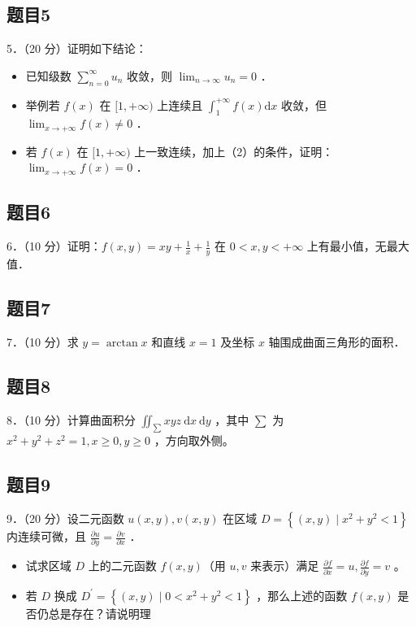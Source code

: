 \documentclass{article}
\begin{document}
\subsection{题目5}
5．（20 分）证明如下结论：

\begin{itemize}
  \item[（1）] 已知级数 \(\sum_{n=0}^{\infty} u_{n}\) 收敛，则 \(\lim _{n \rightarrow \infty} u_{n}=0\) ．
  \item[（2）] 举例若 \(f(x)\) 在 \([1,+\infty)\) 上连续且 \(\int_{1}^{+\infty} f(x) \mathrm{d} x\) 收敛，但 \(\lim _{x \rightarrow+\infty} f(x) \neq 0\) ．
  \item[（3）] 若 \(f(x)\) 在 \([1,+\infty)\) 上一致连续，加上（2）的条件，证明： \(\lim _{x \rightarrow+\infty} f(x)=0\) ．
\end{itemize}

\subsection{题目6}
6．（10 分）证明：\(f(x, y)=x y+\frac{1}{x}+\frac{1}{y}\) 在 \(0<x, y<+\infty\) 上有最小值，无最大值．

\subsection{题目7}
7．（10 分）求 \(y=\arctan x\) 和直线 \(x=1\) 及坐标 \(x\) 轴围成曲面三角形的面积．

\subsection{题目8}
8．（10 分）计算曲面积分 \(\iint_{\sum} x y z \mathrm{~d} x \mathrm{~d} y\) ，其中 \(\sum\) 为 \(x^{2}+y^{2}+z^{2}=1, x \geq 0, y \geq 0\) ，方向取外侧。

\subsection{题目9}
9．（20 分）设二元函数 \(u(x, y), v(x, y)\) 在区域 \(D=\left\{(x, y) \mid x^{2}+y^{2}<1\right\}\) 内连续可微，且 \(\frac{\partial u}{\partial y}=\frac{\partial v}{\partial x}\) ．

\begin{itemize}
  \item[（1）] 试求区域 \(D\) 上的二元函数 \(f(x, y)\)（用 \(u, v\) 来表示）满足 \(\frac{\partial f}{\partial x}=u, \frac{\partial f}{\partial y}=v\) 。
  \item[（2）] 若 \(D\) 换成 \(D^{\prime}=\left\{(x, y) \mid 0<x^{2}+y^{2}<1\right\}\) ，那么上述的函数 \(f(x, y)\) 是否仍总是存在？请说明理
\end{itemize}
\end{document}
